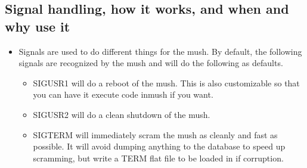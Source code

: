 \documentclass[letterpaper,10pt,english]{sphinxmanual}
\begin{document}
\subsection{Signal handling, how it works, and when and why use it}
\label{\detokenize{features:signal-handling-how-it-works-and-when-and-why-use-it}}\begin{itemize}
\item {} 
\sphinxAtStartPar
Signals are used to do different things for the mush.  By default,
the following signals are recognized by the mush and will do
the following as defaults.
\begin{itemize}
\item {} 
\sphinxAtStartPar
SIGUSR1 \sphinxhyphen{} will do a reboot of the mush.  This is also customizable so that you can have it execute code in\sphinxhyphen{}mush if you want.

\item {} 
\sphinxAtStartPar
SIGUSR2 \sphinxhyphen{} will do a clean shutdown of the mush.

\item {} 
\sphinxAtStartPar
SIGTERM \sphinxhyphen{} will immediately scram the mush as cleanly and fast as possible.  It will avoid dumping anything to the database to speed up scramming, but write a TERM flat file to be loaded in if corruption.

\end{itemize}

\end{itemize}
\end{document}

